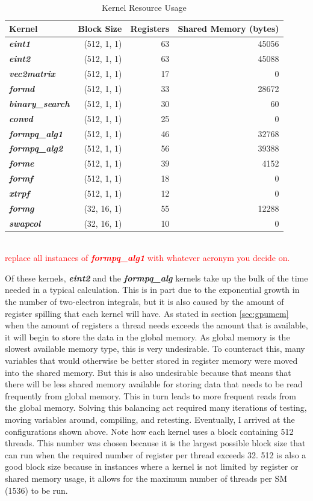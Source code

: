 \documentclass[12pt]{report}
\newcommand{\notetodylan}[1]{\textcolor{red}{#1}} %
\newcommand{\kernel}[1]{\textit{\textbf{#1}}}
\begin{document}
\begin{table}[h]
\caption{Kernel Resource Usage}
\label{tab:resources}
\begin{tabular}{lrrr}
	Kernel				&	Block Size		&	Registers	&	Shared Memory (bytes)	\\
	\hline
	\kernel{eint1}			&	(512, 1, 1)		&	63		&	45056				\\
	\kernel{eint2}			&	(512, 1, 1)		&	63		&	45088				\\
	\kernel{vec2matrix}		&	(512, 1, 1)		&	17		&	0					\\
	\kernel{formd}			&	(512, 1, 1)		&	33		&	28672				\\
	\kernel{binary\_search}	&	(512, 1, 1)		&	30		&	60					\\
	\kernel{convd}			&	(512, 1, 1)		&	25		&	0					\\
	\kernel{formpq\_alg1}	&	(512, 1, 1)		&	46		&	32768				\\
	\kernel{formpq\_alg2}	&	(512, 1, 1)		&	56		&	39388				\\
	\kernel{forme}			&	(512, 1, 1)		&	39		&	4152					\\
	\kernel{formf}			&	(512, 1, 1)		&	18		&	0					\\
	\kernel{xtrpf}			&	(512, 1, 1)		&	12		&	0					\\
	\kernel{formg}			&	(32, 16, 1)		&	55		&	12288				\\
	\kernel{swapcol}		&	(32, 16, 1)		&	10		&	0					\\
\end{tabular}\\
\notetodylan{replace all instances of \kernel{formpq\_alg1} with whatever acronym you decide on.}
\end{table}

Of these kernels, \kernel{eint2} and the \kernel{formpq\_alg} kernels take up the bulk of the time needed in a typical calculation. This is in part due to the exponential growth in the number of two-electron integrals, but it is also caused by the amount of register spilling that each kernel will have. As stated in section \ref{sec:gpumem} when the amount of registers a thread needs exceeds the amount that is available, it will begin to store the data in the global memory. As global memory is the slowest available memory type, this is very undesirable. To counteract this, many variables that would otherwise be better stored in register memory were moved into the shared memory. But this is also undesirable because that means that there will be less shared memory available for storing data that needs to be read frequently from global memory. This in turn leads to more frequent reads from the global memory. Solving this balancing act required many iterations of testing, moving variables around, compiling, and retesting. Eventually, I arrived at the configurations shown above. Note how each kernel uses a block containing 512 threads. This number was chosen because it is the largest possible block size that can run when the required number of register per thread exceeds 32. 512 is also a good block size because in instances where a kernel is not limited by register or shared memory usage, it allows for the maximum number of threads per SM (1536) to be run.
\end{document}
